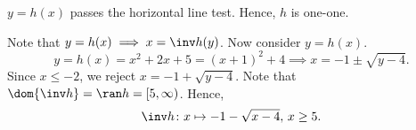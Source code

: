 \begin{solution}
\begin{ppart}
\begin{center}
        \end{center}

        $y=h(x)$ passes the horizontal line test. Hence, $h$ is one-one.
        
        Note that $y = h(x) \implies x = \inv h(y)$. Now consider $y = h(x)$. \[y = h(x) = x^2 + 2x + 5 = (x+1)^2 + 4 \implies x = -1 \pm \sqrt{y - 4}.\] Since $x \leq -2$, we reject $x = -1 + \sqrt{y-4}$. Note that $\dom{\inv h} = \ran h = [5, \infty)$. Hence, \[\inv h \colon x \mapsto -1-\sqrt{x-4}, \, x \geq 5.\]
    \end{ppart}
\end{solution}

